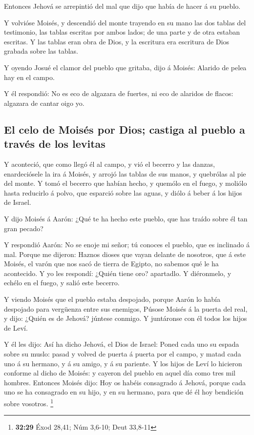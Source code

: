  Entonces Jehová se arrepintió del mal que dijo que había
de hacer á su pueblo.

 Y volvióse Moisés, y descendió del monte trayendo en su
mano las dos tablas del testimonio, las tablas escritas por ambos lados;
de una parte y de otra estaban escritas.  Y las tablas
eran obra de Dios, y la escritura era escritura de Dios grabada sobre
las tablas.

 Y oyendo Josué el clamor del pueblo que gritaba, dijo á
Moisés: Alarido de pelea hay en el campo.

 Y él respondió: No es eco de algazara de fuertes, ni eco
de alaridos de flacos: algazara de cantar oigo yo.

\hypertarget{el-celo-de-moisuxe9s-por-dios-castiga-al-pueblo-a-travuxe9s-de-los-levitas}{%
\subsection{El celo de Moisés por Dios; castiga al pueblo a través de
los
levitas}\label{el-celo-de-moisuxe9s-por-dios-castiga-al-pueblo-a-travuxe9s-de-los-levitas}}

 Y aconteció, que como llegó él al campo, y vió el
becerro y las danzas, enardeciósele la ira á Moisés, y arrojó las tablas
de sus manos, y quebrólas al pie del monte.  Y tomó el
becerro que habían hecho, y quemólo en el fuego, y moliólo hasta
reducirlo á polvo, que esparció sobre las aguas, y diólo á beber á los
hijos de Israel.

 Y dijo Moisés á Aarón: ¿Qué te ha hecho este pueblo, que
has traído sobre él tan gran pecado?

 Y respondió Aarón: No se enoje mi señor; tú conoces el
pueblo, que es inclinado á mal.  Porque me dijeron:
Haznos dioses que vayan delante de nosotros, que á este Moisés, el varón
que nos sacó de tierra de Egipto, no sabemos qué le ha acontecido.
 Y yo les respondí: ¿Quién tiene oro? apartadlo. Y
diéronmelo, y echélo en el fuego, y salió este becerro.

 Y viendo Moisés que el pueblo estaba despojado, porque
Aarón lo había despojado para vergüenza entre sus enemigos,
 Púsose Moisés á la puerta del real, y dijo: ¿Quién es de
Jehová? júntese conmigo. Y juntáronse con él todos los hijos de Leví.

 Y él les dijo: Así ha dicho Jehová, el Dios de Israel:
Poned cada uno su espada sobre su muslo: pasad y volved de puerta á
puerta por el campo, y matad cada uno á su hermano, y á su amigo, y á su
pariente.  Y los hijos de Leví lo hicieron conforme al
dicho de Moisés: y cayeron del pueblo en aquel día como tres mil
hombres.  Entonces Moisés dijo: Hoy os habéis consagrado
á Jehová, porque cada uno se ha consagrado en su hijo, y en su hermano,
para que dé él hoy bendición sobre vosotros. \footnote{\textbf{32:29}
  Éxod 28,41; Núm 3,6-10; Deut 33,8-11}


